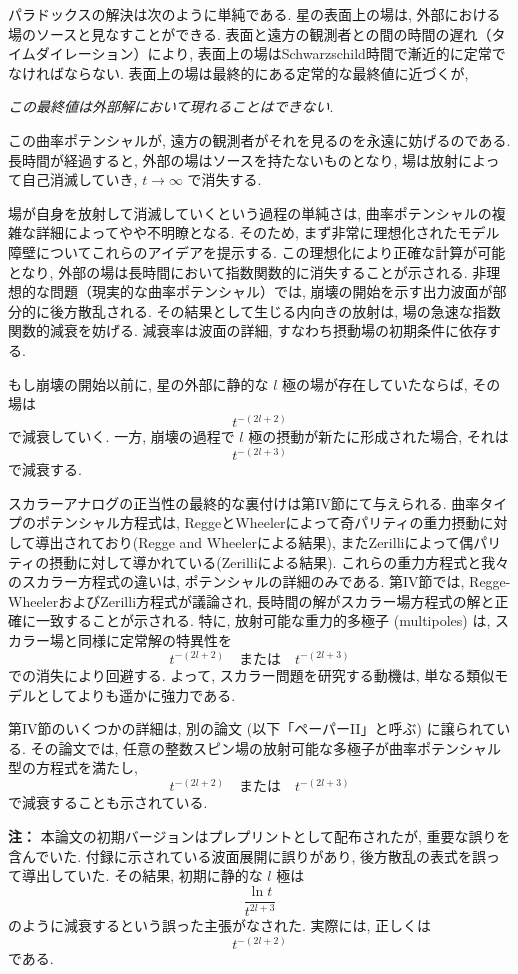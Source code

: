 \documentclass[a4paper,12pt]{article}
\begin{document}
パラドックスの解決は次のように単純である. 星の表面上の場は, 外部における場のソースと見なすことができる. 表面と遠方の観測者との間の時間の遅れ（タイムダイレーション）により, 表面上の場はSchwarzschild時間で漸近的に定常でなければならない. 表面上の場は最終的にある定常的な最終値に近づくが,

\emph{この最終値は外部解において現れることはできない}.

この曲率ポテンシャルが, 遠方の観測者がそれを見るのを永遠に妨げるのである. 長時間が経過すると, 外部の場はソースを持たないものとなり, 場は放射によって自己消滅していき, $t \to \infty$ で消失する.

場が自身を放射して消滅していくという過程の単純さは, 曲率ポテンシャルの複雑な詳細によってやや不明瞭となる.
そのため, まず非常に理想化されたモデル障壁についてこれらのアイデアを提示する. この理想化により正確な計算が可能となり, 外部の場は長時間において指数関数的に消失することが示される.
非理想的な問題（現実的な曲率ポテンシャル）では, 崩壊の開始を示す出力波面が部分的に後方散乱される. その結果として生じる内向きの放射は, 場の急速な指数関数的減衰を妨げる. 減衰率は波面の詳細, すなわち摂動場の初期条件に依存する.

もし崩壊の開始以前に, 星の外部に静的な $l$ 極の場が存在していたならば, その場は
\begin{equation*}
    t^{-(2l+2)}
\end{equation*}
で減衰していく.
一方, 崩壊の過程で $l$ 極の摂動が新たに形成された場合, それは
\begin{equation*}
    t^{-(2l+3)}
\end{equation*}
で減衰する.

スカラーアナログの正当性の最終的な裏付けは第IV節にて与えられる.
曲率タイプのポテンシャル方程式は, ReggeとWheelerによって奇パリティの重力摂動に対して導出されており(Regge and Wheelerによる結果), またZerilliによって偶パリティの摂動に対して導かれている(Zerilliによる結果).
これらの重力方程式と我々のスカラー方程式の違いは, ポテンシャルの詳細のみである.
第IV節では, Regge-WheelerおよびZerilli方程式が議論され, 長時間の解がスカラー場方程式の解と正確に一致することが示される.
特に, 放射可能な重力的多極子 (multipoles) は, スカラー場と同様に定常解の特異性を
\begin{equation*}
    t^{-(2l+2)} \quad \text{または} \quad t^{-(2l+3)}
\end{equation*}
での消失により回避する.
よって, スカラー問題を研究する動機は, 単なる類似モデルとしてよりも遥かに強力である.

第IV節のいくつかの詳細は, 別の論文 (以下「ペーパーII」と呼ぶ) に譲られている.
その論文では, 任意の整数スピン場の放射可能な多極子が曲率ポテンシャル型の方程式を満たし,
\begin{equation*}
    t^{-(2l+2)} \quad \text{または} \quad t^{-(2l+3)}
\end{equation*}
で減衰することも示されている.

\bigskip

\noindent\textbf{注：}
本論文の初期バージョンはプレプリントとして配布されたが, 重要な誤りを含んでいた.
付録に示されている波面展開に誤りがあり, 後方散乱の表式を誤って導出していた.
その結果, 初期に静的な $l$ 極は
\begin{equation*}
\frac{\ln t}{t^{2l+3}}
\end{equation*}
のように減衰するという誤った主張がなされた. 実際には, 正しくは
\begin{equation*}
    t^{-(2l+2)}
\end{equation*}
である.
\end{document}
